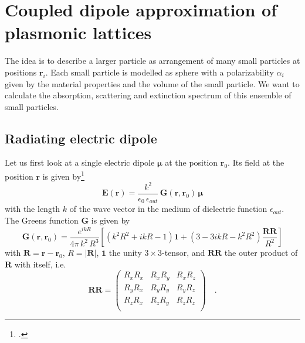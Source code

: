\renewcommand{\lastmod}{May 20, 2021}
\renewcommand{\chapterauthors}{Markus Lippitz}


\chapter{Coupled dipole approximation of plasmonic lattices}


The idea is to describe a larger particle as arrangement of many small particles at positions $\mathbf{r}_i$.
Each small particle is modelled as sphere  with a  polarizability $\alpha_i$ given by the material properties and the volume of the small particle. We want to calculate the absorption, scattering and extinction spectrum of this  ensemble of small particles.


\section{Radiating electric dipole}

Let us first look at a single electric dipole $\boldsymbol{\mu}$ at the position $\mathbf{r}_0$. Its field at the position $\mathbf{r}$ is given by\footcite[eq. 8.52]{Novotny-Hecht2012} 
\begin{equation}
\mathbf{E}(\mathbf{r}) = \frac{k^2}{\epsilon_0 \, \epsilon_{out}} \, \mathbf{G}(\mathbf{r}, \mathbf{r}_0) \,  \boldsymbol{\mu}
\end{equation}
with the length $k$ of the wave vector in the medium of dielectric function $\epsilon_{out}$.
The Greens function $\mathbf{G}$ is given by
\begin{equation}
\mathbf{G}(\mathbf{r}, \mathbf{r}_0) = \frac{e^{i k R} }{4 \pi \, k^2 \, R^3 } 
\left[  
 \left( k^2 R^2 + i k R  - 1 \right) \mathbf{1}  +    
  \left( 3 - 3 i k R - k^2 R^2  \right) \frac{\mathbf{RR}}{R^2}   
  \right]
\end{equation}
with $\mathbf{R} = \mathbf{r} - \mathbf{r}_0$, $R = |\mathbf{R}|$, $\mathbf{1}$ the unity $3 \times 3$-tensor, and $\mathbf{RR}$ the outer product of $\mathbf{R}$ with itself, i.e.
\begin{equation}
\mathbf{RR} = 
\begin{pmatrix}
R_x R_x &  R_x R_y & R_x R_z \\
R_y R_x &  R_y R_y & R_y R_z \\
R_z R_x &  R_z R_y & R_z R_z \\
\end{pmatrix} \quad .
\end{equation}


